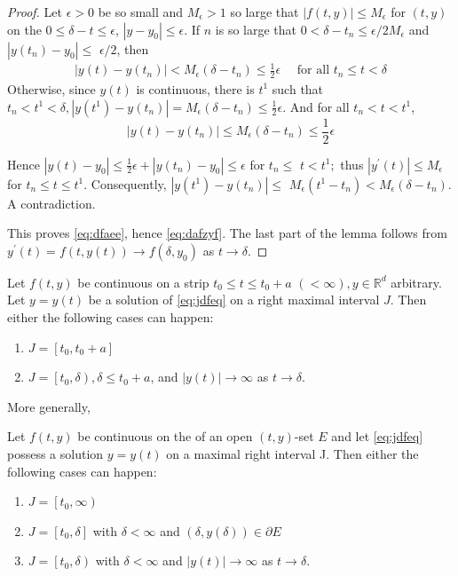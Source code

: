 \documentclass{article}
\begin{document}
\begin{proof}
Let $\epsilon>0$ be so small and $M_{\epsilon}>1$ so large that $|f(t, y)| \le M_{\epsilon}$ for $(t, y)$ on the  $0 \le \delta-t \le \epsilon$, $\left|y-y_{0}\right| \le \epsilon$. If $n$ is so large that $0<\delta-t_{n} \le \epsilon / 2 M_{\epsilon}$ and $\left|y\left(t_{n}\right)-y_{0}\right| \le$ $\epsilon / 2$, then
\begin{align}
    \left|y(t)-y\left(t_{n}\right)\right|<M_{\epsilon}\left(\delta-t_{n}\right) \le \frac{1}{2} \epsilon \quad\text{ for all }t_{n} \le t<\delta\label{eq:dfaee}
\end{align}
Otherwise, since $y(t)$ is continuous, there is  $t^{1}$ such that $t_{n}<t^{1}<\delta,\left|y\left(t^{1}\right)-y\left(t_{n}\right)\right|= M_\epsilon\left(\delta-t_{n}\right) \le \frac{1}{2} \epsilon$. And for all $t_n<t<t^1$, 
$$|y(t)-y(t_n)|\le M_\epsilon\left(\delta-t_{n}\right)  \le \frac{1}{2} \epsilon$$

Hence $\left|y(t)-y_{0}\right| \le \frac{1}{2} \epsilon+\left|y\left(t_{n}\right)-y_{0}\right| \le \epsilon$ for $t_{n} \le$ $t<t^{1} ;$ thus $\left|y^{\prime}(t)\right| \le M_{\epsilon}$ for $t_{n} \le t \le t^{1}$. Consequently, $\left|y\left(t^{1}\right)-y\left(t_{n}\right)\right| \le$ $M_{\epsilon}\left(t^{1}-t_{n}\right)<M_{\epsilon}\left(\delta-t_{n}\right) .$ A contradiction.

This proves \cref{eq:dfaee}, hence \cref{eq:dafzyf}. The last part of the lemma follows from $y^{\prime}(t)=f(t, y(t)) \rightarrow f\left(\delta, y_{0}\right)$ as $t \rightarrow \delta$.
\end{proof}
\begin{cora}\label{cor:jdaod}
Let $f(t, y)$ be continuous on a strip $t_{0} \le t \le t_{0}+a$ $(<\infty), y \in \mathbb{R}^{d}$ arbitrary. Let $y=y(t)$ be a solution of \cref{eq:jdfeq} on a right maximal interval $J .$ Then either the following cases can happen:
\begin{enumerate}
    \item $J=\left[t_{0}, t_{0}+a\right]$
    \item $J=\left[t_{0}, \delta\right), \delta \le t_{0}+a$, and $|y(t)| \rightarrow \infty$ as $t \rightarrow \delta$.
\end{enumerate}
\end{cora}
More generally,
\begin{cora}
Let $f(t, y)$ be continuous on the  of an open $(t, y)$-set $E$ and let \cref{eq:jdfeq} possess a solution $y=y(t)$ on a maximal right interval J. Then either the following cases can happen:
\begin{enumerate}
    \item $J=\left[t_{0}, \infty\right)$
    \item $J=\left[t_{0}, \delta\right]$ with $\delta<\infty$ and $(\delta, y(\delta)) \in \partial E$
    \item $J=\left[t_{0}, \delta\right)$ with $\delta<\infty$ and $|y(t)| \rightarrow \infty$ as $t \rightarrow \delta .$
\end{enumerate}
\end{cora}
\end{document}
